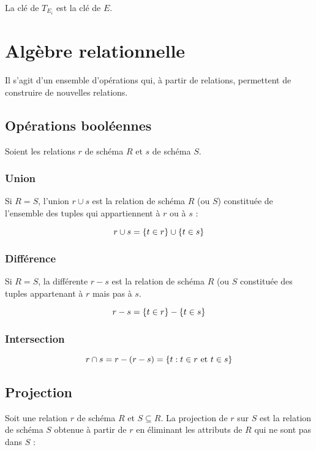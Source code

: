 		La clé de $T_{E_i}$ est la clé de $E$.
		
		
	\section{Algèbre relationnelle}
	
	Il s'agit d'un ensemble d'opérations qui, à partir de relations, permettent de construire de nouvelles relations.
	
	
	
		\subsection{Opérations booléennes}
		
		Soient les relations $r$ de schéma $R$ et $s$ de schéma $S$.
		
			\subsubsection{Union}
			
			Si $R = S$, l'union $r \cup s$ est la relation de schéma $R$ (ou $S$) constituée de l'ensemble des tuples qui appartiennent à $r$ ou à $s$ :
			
			$$r \cup s = \lbrace t \in r \rbrace \cup \lbrace t \in s \rbrace$$
			
			\subsubsection{Différence}
			
			Si $R = S$, la différente $r - s$ est la relation de schéma $R$ (ou $S$ constituée des tuples appartenant à $r$ mais pas à $s$.
			
			$$r - s = \lbrace t \in r \rbrace - \lbrace t \in s \rbrace$$
			
			\subsubsection{Intersection}
			
			$$r \cap s = r - (r - s) = \lbrace t : t \in r \text{ et } t \in s \rbrace$$
			
		\subsection{Projection}
		
		Soit une relation $r$ de schéma $R$ et $S \subseteq R$. La projection de $r$ sur $S$ est la relation de schéma $S$ obtenue à partir de $r$ en éliminant les attributs de $R$ qui ne sont pas dans $S$ :
		
